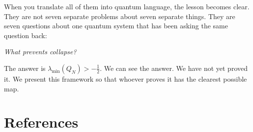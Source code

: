 \documentclass[12pt]{article}
\newcommand{\half}{\tfrac{1}{2}}
\begin{document}
When you translate all of them into quantum language,
the lesson becomes clear.
They are not seven separate problems about seven separate things.
They are seven questions about one quantum system
that has been asking the same question back:

\emph{What prevents collapse?}

The answer is $\lambda_{\min}(Q_N) > -\half$.
We can see the answer.
We have not yet proved it.
We present this framework so that whoever proves it
has the clearest possible map.

\section*{References}
\end{document}
